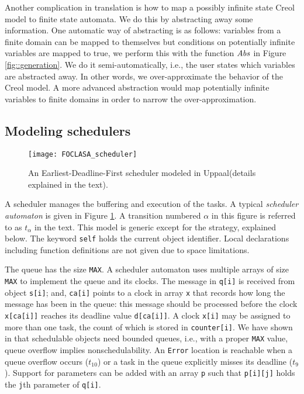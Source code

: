\documentclass[copyright,creativecommons]{eptcs}
\theoremstyle{definition}
\renewcommand{\paragraph}[1]{\medskip \noindent {\bf #1}}
\newcommand{\Uppaal}{{\sc Uppaal}\xspace}
\begin{document}
Another complication in translation is how to map a possibly infinite state Creol model to finite state automata.
We do this by abstracting away some information. One automatic way of abstracting is as follows:  variables from a finite domain can be mapped to themselves but conditions on potentially infinite variables are mapped to true, we perform this with the function  ${\it Abs}$ in Figure \ref{fig::generation}. We do it semi-automatically, i.e., the user states which variables are abstracted away. In other words, we over-approximate the behavior of the Creol model. A more advanced abstraction would map potentially infinite variables to finite domains in order to narrow the over-approximation.







\subsection{Modeling schedulers}
\label{sec::scheduler}

\begin{figure}
\centering
 \texttt{[image: FOCLASA\_scheduler]}
 \caption{An Earliest-Deadline-First scheduler modeled in \Uppaal (details explained in the text).}
 \label{fig:scheduler}
\end{figure}

A scheduler manages the buffering and execution of the tasks.
A typical {\em scheduler automaton} is given in Figure \ref{fig:scheduler}.
A transition numbered $\alpha$ in this figure is referred to as $t_\alpha$ in the text.
This model is generic except for the strategy, explained below.
The keyword \lstinline{self} holds the current object identifier.
Local declarations including function definitions are not given due to space limitations.


\paragraph{Queue}
The queue has the size \lstinline$MAX$.
A scheduler automaton uses multiple arrays of size \lstinline$MAX$ to implement the queue and its clocks. The message in \lstinline$q[i]$ is received from object \lstinline$s[i]$; and, \lstinline$ca[i]$ points to a clock in array \lstinline$x$ that records how long the message has been in the queue: this message should be processed before the clock \lstinline$x[ca[i]]$ reaches its deadline value \lstinline$d[ca[i]]$.
A clock \lstinline$x[i]$ may be assigned to more than one task, the count of which is stored in \lstinline$counter[i]$.
We have shown in \cite{Jaghoori09jlap} that schedulable objects need bounded queues, i.e., with a proper \lstinline$MAX$ value, queue overflow implies nonschedulability.
An \lstinline$Error$ location is reachable when a queue overflow occurs ($t_{10}$) or a task in the queue explicitly misses its deadline ($t_9$).
Support for parameters can be added with an array \lstinline$p$ such that \lstinline$p[i][j]$ holds the \lstinline$j$th parameter of \lstinline$q[i]$.
\end{document}
